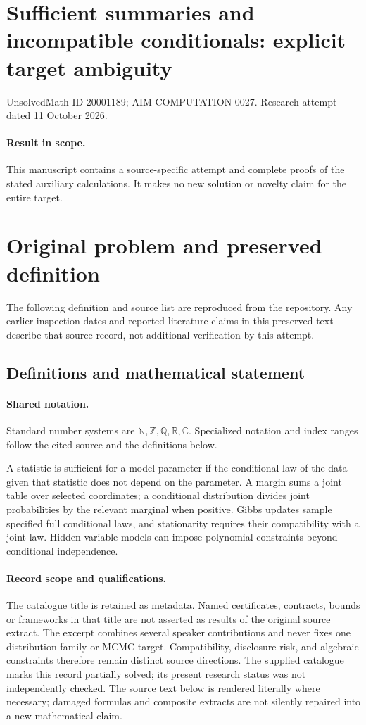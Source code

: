 \documentclass[11pt]{article}
\begin{document}
\section*{Sufficient summaries and incompatible conditionals: explicit target ambiguity}
\noindent UnsolvedMath ID 20001189; AIM-COMPUTATION-0027. Research attempt dated 11 October 2026.
\paragraph{Result in scope.}This manuscript contains a source-specific attempt and complete proofs of the stated auxiliary calculations. It makes no new solution or novelty claim for the entire target.
\section{Original problem and preserved definition}
The following definition and source list are reproduced from the repository. Any earlier inspection dates and reported literature claims in this preserved text describe that source record, not additional verification by this attempt.
\subsection{Definitions and mathematical statement}

\paragraph{Shared notation.}Standard number systems are $\mathbb N,\mathbb Z,\mathbb Q,\mathbb R,\mathbb C$. Specialized notation and index ranges follow the cited source and the definitions below.


A statistic is sufficient for a model parameter if the conditional law of the data given that statistic does not depend on the parameter. A margin sums a joint table over selected coordinates; a conditional distribution divides joint probabilities by the relevant marginal when positive. Gibbs updates sample specified full conditional laws, and stationarity requires their compatibility with a joint law. Hidden-variable models can impose polynomial constraints beyond conditional independence.
\paragraph{Record scope and qualifications.}
The catalogue title is retained as metadata. Named certificates, contracts, bounds or frameworks in that title are not asserted as results of the original source extract.
The excerpt combines several speaker contributions and never fixes one distribution family or MCMC target. Compatibility, disclosure risk, and algebraic constraints therefore remain distinct source directions. The supplied catalogue marks this record partially solved; its present research status was not independently checked.
The source text below is rendered literally where necessary; damaged formulas and composite extracts are not silently repaired into a new mathematical claim.
\end{document}
